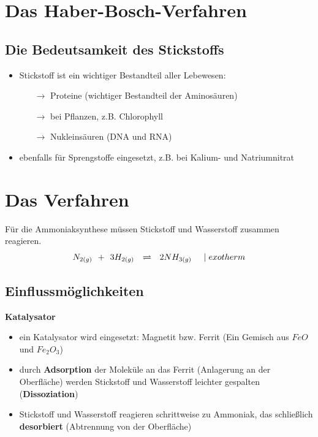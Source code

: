 \documentclass[11pt]{article}
\begin{document}
\pagestyle{fancy}

\fancyhead{}

\fancyfoot{}

\section*{\LARGE{Das Haber-Bosch-Verfahren}}
\vspace{.5cm}
\subsection*{Die Bedeutsamkeit des Stickstoffs}

    \begin{itemize}
        \item Stickstoff ist ein wichtiger Bestandteil aller Lebewesen:
        \begin{itemize}
            \item[$\rightarrow$] Proteine (wichtiger Bestandteil der Aminosäuren)
            \item[$\rightarrow$] bei Pflanzen, z.B. Chlorophyll
            \item[$\rightarrow$] Nukleinsäuren (DNA und RNA)
        \end{itemize}
        \item ebenfalls für Sprengstoffe eingesetzt, z.B. bei Kalium- und Natriumnitrat
    \end{itemize} 
\section*{Das Verfahren}
Für die Ammoniaksynthese müssen Stickstoff und Wasserstoff zusammen reagieren. 
$$N_{2(g)}\hspace{.15cm} +\hspace{.15cm} 3H_{2(g)}\hspace{.25cm} \rightleftharpoons\hspace{.25cm} 2NH_{3(g)}\hspace{.5cm}|\hspace{.1cm}exotherm$$
\subsection*{Einflussmöglichkeiten}
    \textbf{Katalysator}
        \begin{itemize}
            \item ein Katalysator wird eingesetzt: Magnetit bzw. Ferrit (Ein Gemisch aus $FeO$ und $Fe_2O_3$)
            \item durch \textbf{Adsorption} der Moleküle an das Ferrit (Anlagerung an der Oberfläche) werden Stickstoff und Wasserstoff leichter gespalten (\textbf{Dissoziation})
            \item Stickstoff und Wasserstoff reagieren schrittweise zu Ammoniak, das schließlich \textbf{desorbiert} (Abtrennung von der Oberfläche)
    \end{itemize}
\end{document}
